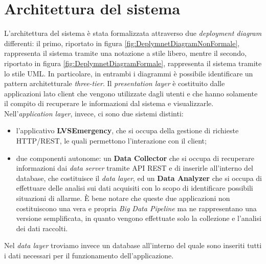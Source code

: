 \clearpage
\section{Architettura del sistema}
L'architettura del sistema è stata formalizzata attraverso due \textit{deployment diagram} differenti: il primo, riportato in figura \ref{fig:DeplymnetDiagramNonFormale}, rappresenta il sistema tramite una notazione a stile libero, mentre il secondo, riportato in figura \ref{fig:DeplymnetDiagramFormale}, rappresenta il sistema tramite lo stile UML. In particolare, in entrambi i diagrammi è possibile identificare un pattern architetturale \textit{three-tier}. Il \textit{presentation layer} è costituito dalle applicazioni lato client che vengono utilizzate dagli utenti e che hanno solamente il compito di recuperare le informazioni dal sistema e visualizzarle. Nell'\textit{application layer}, invece, ci sono due sistemi distinti:

\begin{itemize}
	\item l'applicativo \textbf{LVSEmergency}, che si occupa della gestione di richieste HTTP/REST, le quali permettono l'interazione con il client;
	\item due componenti autonome: un \textbf{Data Collector} che si occupa di recuperare informazioni dai \textit{data server} tramite API REST e di inserirle all'interno del database, che costituisce il \textit{data layer}, ed un \textbf{Data Analyzer} che si occupa di effettuare delle analisi sui dati acquisiti con lo scopo di identificare possibili situazioni di allarme. È bene notare che queste due applicazioni non costituiscono una vera e propria \textit{Big Data Pipeline} ma ne rappresentano una versione semplificata, in quanto vengono effettuate solo la collezione e l'analisi dei dati raccolti.
\end{itemize}

Nel \textit{data layer} troviamo invece un database all'interno del quale sono inseriti tutti i dati necessari per il funzionamento dell'applicazione.

